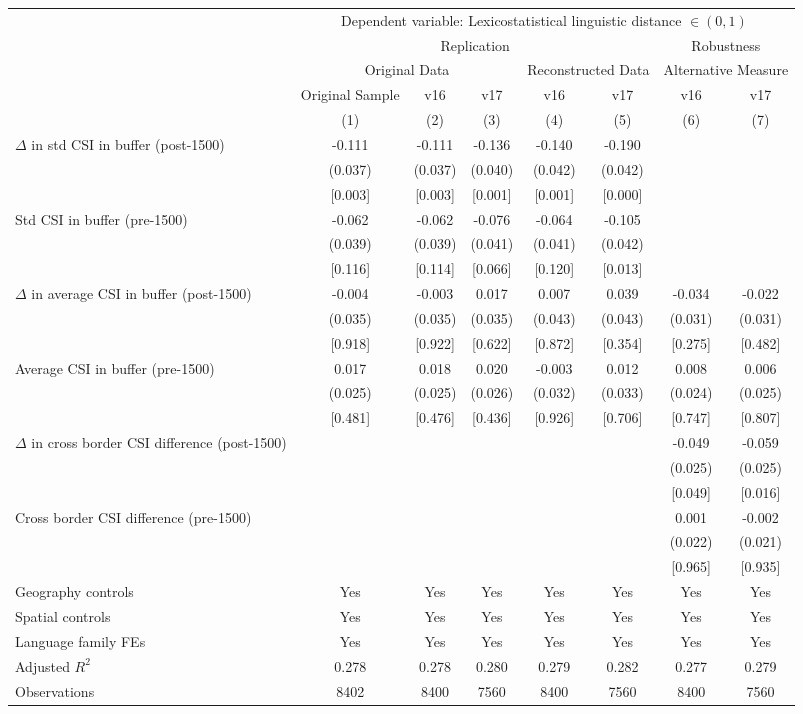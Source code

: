 \begin{tabular}{lccccccc}
\toprule\toprule
 & \multicolumn{7}{c}{Dependent variable: Lexicostatistical linguistic distance $\in(0,1)$}\tabularnewline
 \cmidrule(lr){2-8}
 &\multicolumn{5}{c}{Replication}&\multicolumn{2}{c}{Robustness}\\
 \cmidrule(lr){2-6}\cmidrule(lr){7-8}
 &\multicolumn{3}{c}{Original Data}&\multicolumn{2}{p{1cm}}{\centering Reconstructed Data}&\multicolumn{2}{p{1.5cm}}{\centering Alternative Measure}\\
 \cmidrule(lr){2-4}\cmidrule(lr){5-6}\cmidrule(lr){7-8}
 &\multicolumn{1}{p{1.5cm}}{\centering Original Sample}&\multicolumn{1}{c}{v16}&\multicolumn{1}{c}{v17}&\multicolumn{1}{c}{v16}&\multicolumn{1}{c}{v17}&\multicolumn{1}{c}{v16}&\multicolumn{1}{c}{v17}\\
 \cmidrule(lr){2-2}\cmidrule(lr){3-3}\cmidrule(lr){4-4}\cmidrule(lr){5-5}\cmidrule(lr){6-6}\cmidrule(lr){7-7}\cmidrule(lr){8-8}
 & (1)  & (2)  & (3)  & (4)  & (5)  & (6)  & (7) \tabularnewline
\midrule
    $\Delta$ in std CSI in buffer (post-1500)& -0.111 & -0.111 & -0.136  & -0.140 & -0.190 &  &   \tabularnewline
& (0.037) & (0.037)  & (0.040) & (0.042) & (0.042) &  &   \tabularnewline
& [0.003] & [0.003]  & [0.001]  & [0.001]  & [0.000]  &   &  \tabularnewline

    Std CSI in buffer (pre-1500) & -0.062 & -0.062 & -0.076  & -0.064 & -0.105 &  &  \tabularnewline
& (0.039) & (0.039)  & (0.041) & (0.041) & (0.042) &  &  \tabularnewline
& [0.116] & [0.114]  & [0.066]  & [0.120]  & [0.013]  &   &   \tabularnewline

    $\Delta$ in average CSI in buffer (post-1500) & -0.004 & -0.003 & 0.017  & 0.007 & 0.039 & -0.034 & -0.022 \tabularnewline
& (0.035) & (0.035)  & (0.035) & (0.043) & (0.043) & (0.031) & (0.031) \tabularnewline
& [0.918] & [0.922]  & [0.622]  & [0.872]  & [0.354] & [0.275]  & [0.482] \tabularnewline

    Average CSI in buffer (pre-1500) & 0.017 & 0.018 & 0.020  & -0.003 & 0.012 & 0.008 & 0.006  \tabularnewline
& (0.025) & (0.025)  & (0.026) & (0.032) & (0.033) & (0.024) & (0.025) \tabularnewline
& [0.481] & [0.476]  & [0.436]  & [0.926]  & [0.706] & [0.747]  & [0.807] \tabularnewline

    $\Delta$ in cross border CSI difference (post-1500) &  &  &  &  &  & -0.049 & -0.059  \tabularnewline
 &  &  &  &  &  & (0.025)  & (0.025)  \tabularnewline
 &  &  &  &  &  & [0.049]  & [0.016]  \tabularnewline
 
    Cross border CSI difference (pre-1500) &  &  &  &  &  & 0.001 & -0.002  \tabularnewline
 &  &  &  &  &  & (0.022)  & (0.021)   \tabularnewline
 &  &  &  &  &  & [0.965]  & [0.935]   \tabularnewline
 \midrule
Geography controls  & Yes  & Yes  & Yes  & Yes  & Yes  & Yes  & Yes \tabularnewline
Spatial controls  & Yes  & Yes  & Yes  & Yes  & Yes  & Yes  & Yes \tabularnewline
Language family FEs  & Yes  & Yes  & Yes  & Yes  & Yes  & Yes  & Yes \tabularnewline
Adjusted $R^{2}$ & 0.278 & 0.278 & 0.280 & 0.279 & 0.282 & 0.277 & 0.279  \tabularnewline
Observations  & 8402 & 8400 & 7560 & 8400 & 7560 & 8400 & 7560 \tabularnewline


\end{tabular}
